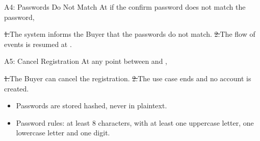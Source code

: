 \begin{flowblock}{A4: Passwords Do Not Match}
At  if the confirm password does not match the password,\par
\st{1.}{The system informs the Buyer that the passwords do not match.}
\st{2.}{The flow of events is resumed at .}
\end{flowblock}
\begin{flowblock}{A5: Cancel Registration}
At any point between  and ,\par
\st{1.}{The Buyer can cancel the registration.}
\st{2.}{The use case ends and no account is created.}
\end{flowblock}
\begin{itemize}
  \item Passwords are stored hashed, never in plaintext.
  \item Password rules: at least 8 characters, with at least one uppercase letter, one lowercase letter and one digit.
\end{itemize}

